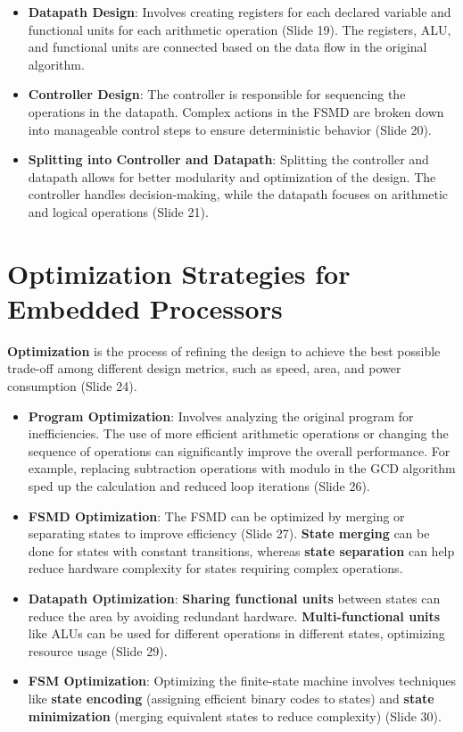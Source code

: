 \documentclass[
  14pt,
  a4paper,
  numbers=noendperiod,
  headinclude=true,
  footinclude=true,
  DIV=calc]{scrreprt}
\begin{document}
\begin{itemize}
\item
  \textbf{Datapath Design}: Involves creating registers for each
  declared variable and functional units for each arithmetic operation
  (Slide 19). The registers, ALU, and functional units are connected
  based on the data flow in the original algorithm.
\item
  \textbf{Controller Design}: The controller is responsible for
  sequencing the operations in the datapath. Complex actions in the FSMD
  are broken down into manageable control steps to ensure deterministic
  behavior (Slide 20).
\item
  \textbf{Splitting into Controller and Datapath}: Splitting the
  controller and datapath allows for better modularity and optimization
  of the design. The controller handles decision-making, while the
  datapath focuses on arithmetic and logical operations (Slide 21).
\end{itemize}

\section{Optimization Strategies for Embedded
Processors}\label{optimization-strategies-for-embedded-processors}

\textbf{Optimization} is the process of refining the design to achieve
the best possible trade-off among different design metrics, such as
speed, area, and power consumption (Slide 24).

\begin{itemize}
\item
  \textbf{Program Optimization}: Involves analyzing the original program
  for inefficiencies. The use of more efficient arithmetic operations or
  changing the sequence of operations can significantly improve the
  overall performance. For example, replacing subtraction operations
  with modulo in the GCD algorithm sped up the calculation and reduced
  loop iterations (Slide 26).
\item
  \textbf{FSMD Optimization}: The FSMD can be optimized by merging or
  separating states to improve efficiency (Slide 27). \textbf{State
  merging} can be done for states with constant transitions, whereas
  \textbf{state separation} can help reduce hardware complexity for
  states requiring complex operations.
\item
  \textbf{Datapath Optimization}: \textbf{Sharing functional units}
  between states can reduce the area by avoiding redundant hardware.
  \textbf{Multi-functional units} like ALUs can be used for different
  operations in different states, optimizing resource usage (Slide 29).
\item
  \textbf{FSM Optimization}: Optimizing the finite-state machine
  involves techniques like \textbf{state encoding} (assigning efficient
  binary codes to states) and \textbf{state minimization} (merging
  equivalent states to reduce complexity) (Slide 30).
\end{itemize}
\end{document}
